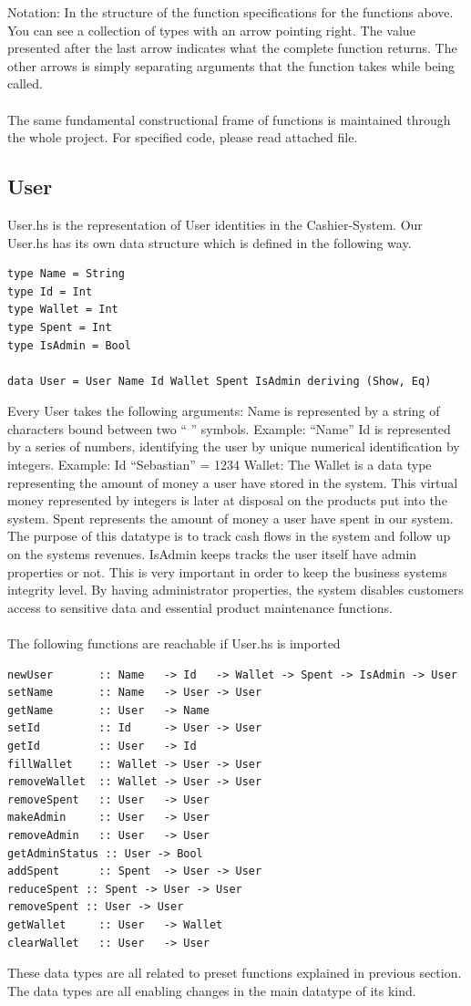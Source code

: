 \documentclass[11pt]{article}
\begin{document}
Notation: In the structure of the function specifications for the functions above. You can see a collection of types with an arrow pointing right. The value presented after the last arrow indicates what the complete function returns. The other arrows is simply separating arguments that the function takes while being called.
\\\\
The same fundamental constructional frame of functions is maintained through the whole project. For specified code, please read attached file.

\pagebreak
\subsection{User}
User.hs is the representation of User identities in the Cashier-System. Our User.hs has its own data structure which is defined in the following way.
\begin{lstlisting}
type Name = String
type Id = Int
type Wallet = Int
type Spent = Int
type IsAdmin = Bool

data User = User Name Id Wallet Spent IsAdmin deriving (Show, Eq)
\end{lstlisting}
Every User takes the following arguments:
Name is represented by a string of characters bound between two “ ” symbols.
Example: “Name”
Id is represented by a series of numbers, identifying the user by unique numerical identification by integers.
Example: Id “Sebastian” = 1234
Wallet: The Wallet is a data type representing the amount of money a user have stored in the system. This virtual money represented by integers is later at disposal on the products put into the system.
Spent represents the amount of money a user have spent in our system. The purpose of this datatype is to track cash flows in the system and follow up on the systems revenues.
IsAdmin keeps tracks the user itself have admin properties or not. This is very important in order to keep the business systems integrity level. By having administrator properties, the system disables customers access to sensitive data and essential product maintenance functions.
\\\\
The following functions are reachable if User.hs is imported\\
\begin{lstlisting}
newUser       :: Name   -> Id   -> Wallet -> Spent -> IsAdmin -> User
setName       :: Name   -> User -> User
getName       :: User   -> Name
setId         :: Id     -> User -> User
getId         :: User   -> Id
fillWallet    :: Wallet -> User -> User
removeWallet  :: Wallet -> User -> User
removeSpent   :: User   -> User
makeAdmin     :: User   -> User
removeAdmin   :: User   -> User
getAdminStatus :: User -> Bool
addSpent      :: Spent  -> User -> User
reduceSpent :: Spent -> User -> User
removeSpent :: User -> User
getWallet     :: User   -> Wallet
clearWallet   :: User   -> User
\end{lstlisting}
These data types are all related to preset functions explained in previous section.
The data types are all enabling changes in the main datatype of its kind.
\end{document}
